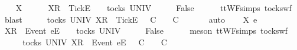 \begin{isabellebody}
\isamarkupfalse%
\isanewline
\ \ \isamarkupfalse%
\ X\ {\isasymrho}\ {\isasymsigma}\isanewline
\ \ \isamarkupfalse%
\ {\isachardoublequoteopen}{\isacharbrackleft}X{\isacharbrackright}\isactrlsub R\ {\isacharhash}\ {\isacharbrackleft}Tick{\isacharbrackright}\isactrlsub E\ {\isacharhash}\ {\isasymrho}\ {\isasymin}\ tocks\ UNIV{\isachardoublequoteclose}\isanewline
\ \ \isamarkupfalse%
\ \isamarkupfalse%
\ {\isachardoublequoteopen}False{\isachardoublequoteclose}\isanewline
\ \ \ \ \isamarkupfalse%
\ ttWF{\isachardot}simps{\isacharparenleft}{}{}{\isacharparenright}\ tocks{\isacharunderscore}wf\ \isamarkupfalse%
\ blast\isanewline
\ \ \isamarkupfalse%
\ \isamarkupfalse%
\ {\isachardoublequoteopen}{\isasymexists}{\isasymrho}{\isacharprime}{\isasymin}tocks\ UNIV{\isachardot}\ {\isacharbrackleft}X{\isacharbrackright}\isactrlsub R\ {\isacharhash}\ {\isacharbrackleft}Tick{\isacharbrackright}\isactrlsub E\ {\isacharhash}\ {\isasymrho}\ {\isasymlesssim}\isactrlsub C\ {\isasymrho}{\isacharprime}\ {\isasymand}\ {\isasymrho}{\isacharprime}\ {\isasymle}\isactrlsub C\ {\isasymsigma}{\isachardoublequoteclose}\isanewline
\ \ \ \ \isamarkupfalse%
\ auto\isanewline
{}\isamarkupfalse%
\isanewline
\ \ \isamarkupfalse%
\ X\ e\ {\isasymrho}\ {\isasymsigma}\isanewline
\ \ \isamarkupfalse%
\ {\isachardoublequoteopen}{\isacharbrackleft}X{\isacharbrackright}\isactrlsub R\ {\isacharhash}\ {\isacharbrackleft}Event\ e{\isacharbrackright}\isactrlsub E\ {\isacharhash}\ {\isasymrho}\ {\isasymin}\ tocks\ UNIV{\isachardoublequoteclose}\isanewline
\ \ \isamarkupfalse%
\ \isamarkupfalse%
\ {\isachardoublequoteopen}False{\isachardoublequoteclose}\isanewline
\ \ \ \ \isamarkupfalse%
\ {\isacharparenleft}meson\ ttWF{\isachardot}simps{\isacharparenleft}{}{}{\isacharparenright}\ tocks{\isacharunderscore}wf{\isacharparenright}\isanewline
\ \ \isamarkupfalse%
\ \isamarkupfalse%
\ {\isachardoublequoteopen}{\isasymexists}{\isasymrho}{\isacharprime}{\isasymin}tocks\ UNIV{\isachardot}\ {\isacharbrackleft}X{\isacharbrackright}\isactrlsub R\ {\isacharhash}\ {\isacharbrackleft}Event\ e{\isacharbrackright}\isactrlsub E\ {\isacharhash}\ {\isasymrho}\ {\isasymlesssim}\isactrlsub C\ {\isasymrho}{\isacharprime}\ {\isasymand}\ {\isasymrho}{\isacharprime}\ {\isasymle}\isactrlsub C\ {\isasymsigma}{\isachardoublequoteclose}\isanewline

\end{isabellebody}
